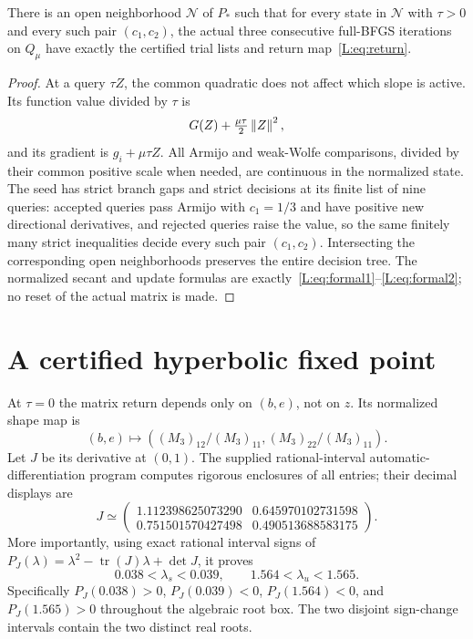 \begin{lemma}\label{L:lem:agreement}
There is an open neighborhood $\mathcal N$ of $P_*$ such that for every state in $\mathcal N$ with $\tau>0$ and every such pair $(c_1,c_2)$, the actual three consecutive full-BFGS iterations on $Q_\mu$ have exactly the certified trial lists and return map~\eqref{L:eq:return}.
\end{lemma}
\begin{proof}
At a query $\tau Z$, the common quadratic does not affect which slope is active. Its function value divided by $\tau$ is
\[
 G(Z)+\tfrac{\mu\tau}{2}\left\lVert Z\right\rVert^2,
\]
and its gradient is $g_i+\mu\tau Z$. All Armijo and weak-Wolfe comparisons, divided by their common positive scale when needed, are continuous in the normalized state. The seed has strict branch gaps and strict decisions at its finite list of nine queries: accepted queries pass Armijo with $c_1=1/3$ and have positive new directional derivatives, and rejected queries raise the value, so the same finitely many strict inequalities decide every such pair $(c_1,c_2)$. Intersecting the corresponding open neighborhoods preserves the entire decision tree. The normalized secant and update formulas are exactly~\eqref{L:eq:formal1}--\eqref{L:eq:formal2}; no reset of the actual matrix is made.
\end{proof}


\setcounter{section}{3}
\setcounter{theorem}{2}
\setcounter{lemma}{1}
\setcounter{corollary}{0}
\setcounter{proposition}{0}
\setcounter{remark}{0}
\setcounter{equation}{5}


\section{A certified hyperbolic fixed point}

At $\tau=0$ the matrix return depends only on $(b,e)$, not on $z$. Its normalized shape map is
\[
 (b,e)\longmapsto ((M_3)_{12}/(M_3)_{11},(M_3)_{22}/(M_3)_{11}).
\]
Let $J$ be its derivative at $(0,1)$. The supplied rational-interval automatic-differentiation program computes rigorous enclosures of all entries; their decimal displays are
\[
 J\simeq\begin{pmatrix}
 1.112398625073290&0.645970102731598\\
 0.751501570427498&0.490513688583175
 \end{pmatrix}.
\]
More importantly, using exact rational interval signs of
$P_J(\lambda)=\lambda^2-\operatorname{tr}(J)\lambda+\det J$, it proves
\begin{equation}\label{L:eq:eigshape}
 0.038<\lambda_s<0.039,\qquad 1.564<\lambda_u<1.565.
\end{equation}
Specifically $P_J(0.038)>0$, $P_J(0.039)<0$, $P_J(1.564)<0$, and $P_J(1.565)>0$ throughout the algebraic root box. The two disjoint sign-change intervals contain the two distinct real roots.

